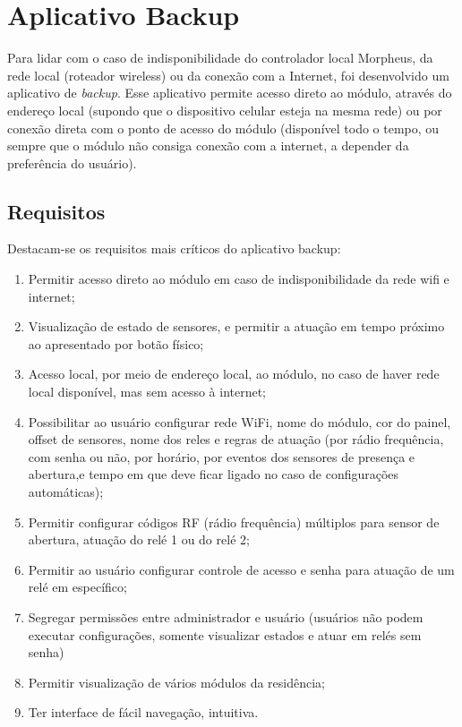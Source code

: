 \section{Aplicativo Backup}

Para lidar com o caso de indisponibilidade do controlador local Morpheus, da rede local (roteador wireless) ou da conexão com a Internet, foi desenvolvido um aplicativo de \textit{backup}. Esse aplicativo permite acesso direto ao módulo, através do endereço local (supondo que o dispositivo celular esteja na mesma rede) ou por conexão direta com o ponto de acesso do módulo (disponível todo o tempo, ou sempre que o módulo não consiga conexão com a internet, a depender da preferência do usuário).

\subsection{Requisitos}

Destacam-se os requisitos mais críticos do aplicativo backup:

\begin{enumerate}
	\item Permitir acesso direto ao módulo em caso de indisponibilidade da rede wifi e internet;
	\item Visualização de estado de sensores, e permitir a atuação em tempo próximo ao apresentado por botão físico;
	\item Acesso local, por meio de endereço local, ao módulo, no caso de haver rede local disponível, mas sem acesso à internet;
	\item Possibilitar ao usuário configurar rede WiFi, nome do módulo, cor do painel, offset de sensores, nome dos reles e regras de atuação (por rádio frequência, com senha ou não, por horário, por eventos dos sensores de presença e abertura,e tempo em que deve ficar ligado no caso de configurações automáticas);
	\item Permitir configurar códigos RF (rádio frequência) múltiplos para sensor de abertura, atuação do relé 1 ou do relé 2;
	\item Permitir ao usuário configurar controle de acesso e senha para atuação de um relé em específico;
	\item Segregar permissões entre administrador e usuário (usuários não podem executar configurações, somente visualizar estados e atuar em relés sem senha)
	\item Permitir visualização de vários módulos da residência;
	\item Ter interface de fácil navegação, intuitiva.
\end{enumerate}

